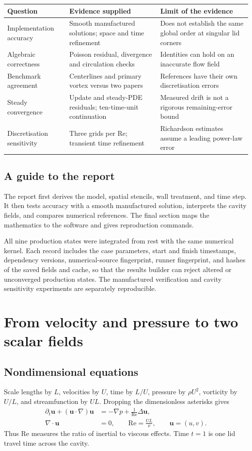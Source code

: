 \documentclass[11pt,a4paper]{article}
\newcommand{\Rey}{\mathrm{Re}}
\begin{document}
\begin{tabularx}{\linewidth}{@{}>{\raggedright\arraybackslash}p{3.3cm}YY@{}}
\toprule
Question & Evidence supplied & Limit of the evidence\\\midrule
Implementation accuracy & Smooth manufactured solutions; space and time refinement & Does not establish the same global order at singular lid corners\\
Algebraic correctness & Poisson residual, divergence and circulation checks & Identities can hold on an inaccurate flow field\\
Benchmark agreement & Centerlines and primary vortex versus two papers & References have their own discretisation errors\\
Steady convergence & Update and steady-PDE residuals; ten-time-unit continuation & Measured drift is not a rigorous remaining-error bound\\
Discretisation sensitivity & Three grids per Re; transient time refinement & Richardson estimates assume a leading power-law error\\
\bottomrule
\end{tabularx}

\subsection{A guide to the report}
The report first derives the model, spatial stencils, wall treatment, and time
step. It then tests accuracy with a smooth manufactured solution, interprets
the cavity fields, and compares numerical references. The final section maps
the mathematics to the software and gives reproduction commands.

All nine production states were integrated from rest with the same numerical
kernel. Each record includes the case parameters, start and finish
timestamps, dependency versions, numerical-source fingerprint, runner
fingerprint, and hashes of the saved fields and cache, so that the results
builder can reject altered or unconverged production states. The manufactured
verification and cavity sensitivity experiments are separately reproducible.

\clearpage
\section{From velocity and pressure to two scalar fields}
\subsection{Nondimensional equations}
Scale lengths by $L$, velocities by $U$, time by $L/U$, pressure by $\rho U^2$,
vorticity by $U/L$, and streamfunction by $UL$. Dropping the dimensionless
asterisks gives
\begin{align}
\partial_t\mathbf{u}+(\mathbf{u}\cdot\nabla)\mathbf{u}
&=-\nabla p+\frac{1}{\Rey}\Delta\mathbf{u},\label{eq:ns}\\
\nabla\cdot\mathbf{u}&=0,\qquad \Rey=\frac{UL}{\nu},\qquad \mathbf{u}=(u,v).
\end{align}
Thus $\Rey$ measures the ratio of inertial to viscous effects. Time $t=1$ is
one lid travel time across the cavity.
\end{document}
